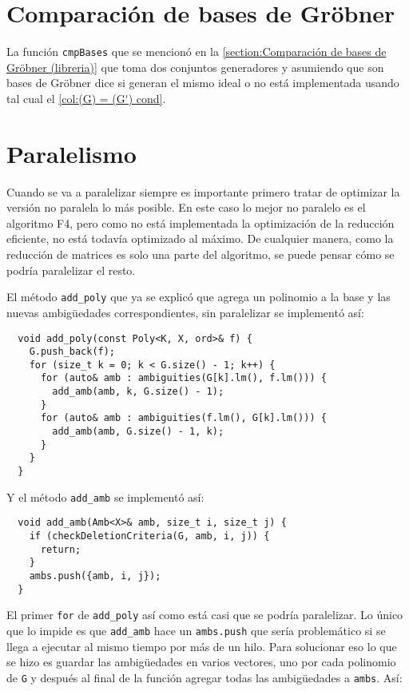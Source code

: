 \documentclass[12pt]{report}
\theoremstyle{customstyle}
\theoremstyle{factstyle}
\begin{document}
\section{Comparación de bases de Gröbner}

La función \texttt{cmpBases} que se mencionó en la \cref{section:Comparación de bases de Gröbner (libreria)} que toma dos conjuntos generadores y asumiendo que son bases de Gröbner dice si generan el mismo ideal o no está implementada usando tal cual el \cref{col:(G) = (G') cond}.

\section{Paralelismo}

Cuando se va a paralelizar siempre es importante primero tratar de optimizar la versión no paralela lo más posible. En este caso lo mejor no paralelo es el algoritmo F4, pero como no está implementada la optimización de la reducción eficiente, no está todavía optimizado al máximo. De cualquier manera, como la reducción de matrices es solo una parte del algoritmo, se puede pensar cómo se podría paralelizar el resto.

El método \texttt{add\_poly} que ya se explicó que agrega un polinomio a la base y las nuevas ambigüedades correspondientes, sin paralelizar se implementó así:

\begin{verbatim}
  void add_poly(const Poly<K, X, ord>& f) {
    G.push_back(f);
    for (size_t k = 0; k < G.size() - 1; k++) {
      for (auto& amb : ambiguities(G[k].lm(), f.lm())) {
        add_amb(amb, k, G.size() - 1);
      }
      for (auto& amb : ambiguities(f.lm(), G[k].lm())) {
        add_amb(amb, G.size() - 1, k);
      }
    }
  }
\end{verbatim}

Y el método \texttt{add\_amb} se implementó así:

\begin{verbatim}
  void add_amb(Amb<X>& amb, size_t i, size_t j) {
    if (checkDeletionCriteria(G, amb, i, j)) {
      return;
    }
    ambs.push({amb, i, j});
  }
\end{verbatim}

El primer \texttt{for} de \texttt{add\_poly} así como está casi que se podría paralelizar. Lo único que lo impide es que \texttt{add\_amb} hace un \texttt{ambs.push} que sería problemático si se llega a ejecutar al mismo tiempo por más de un hilo. Para solucionar eso lo que se hizo es guardar las ambigüedades en varios vectores, uno por cada polinomio de \texttt{G} y después al final de la función agregar todas las ambigüedades a \texttt{ambs}. Así:
\end{document}
